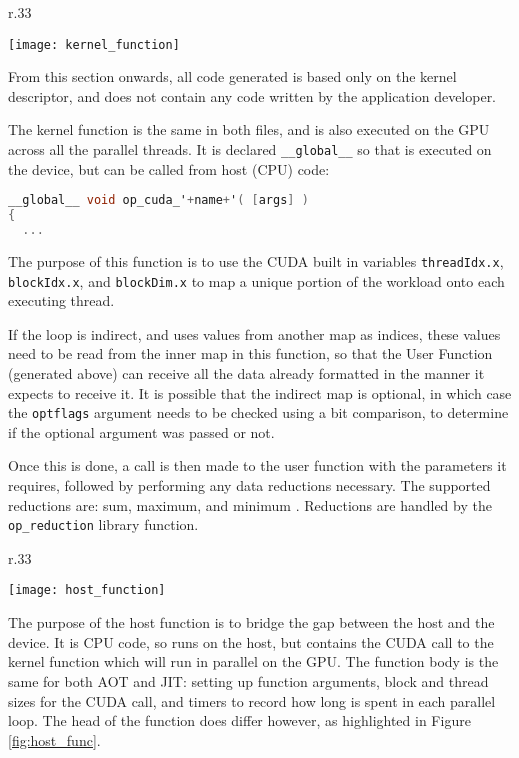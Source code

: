 \begin{wrapfigure}[13]{r}{.33\textwidth}
  \centering
  \caption{Kernel Function}
  \label{fig:krnl_func}
  \texttt{[image: kernel\_function]}
\end{wrapfigure}
From this section onwards, all code generated is based only on the kernel descriptor, and does not contain any code written by the application developer.
\par The kernel function is the same in both files, and is also executed on the GPU across all the parallel threads. It is declared \verb|__global__| so that is executed on the device, but can be called from host (CPU) code:
\begin{lstlisting}[language=C, backgroundcolor=\color{red!20}]
__global__ void op_cuda_'+name+'( [args] )
{
  ...
\end{lstlisting}

\noindent The purpose of this function is to use the CUDA built in variables \verb|threadIdx.x|, \verb|blockIdx.x|, and \verb|blockDim.x| to map a unique portion of the workload onto each executing thread.

 If the loop is indirect, and uses values from another map as indices, these values need to be read from the inner map in this function, so that the User Function (generated above) can receive all the data already formatted in the manner it expects to receive it. It is possible that the indirect map is optional, in which case the \verb|optflags| argument needs to be checked using a bit comparison, to determine if the optional argument was passed or not.
\par
Once this is done, a call is then made to the user function with the parameters it requires, followed by performing any data reductions necessary. The supported reductions are: sum, maximum, and minimum \cite[p11]{manual}. Reductions are handled by the \verb|op_reduction| library function.

\begin{wrapfigure}[10]{r}{.33\textwidth}
  \centering
  \caption{Host Function}
  \label{fig:host_func}
  \texttt{[image: host\_function]}
\end{wrapfigure}
The purpose of the host function is to bridge the gap between the host and the device. It is CPU code, so runs on the host, but contains the CUDA call to the kernel function which will run in parallel on the GPU. The function body is the same for both AOT and JIT: setting up function arguments, block and thread sizes for the CUDA call, and timers to record how long is spent in each parallel loop. The head of the function does differ however, as highlighted in Figure \ref{fig:host_func}.
\vspace{\parskip}

